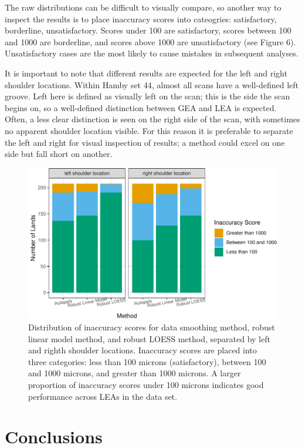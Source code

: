 \documentclass[]{article}
\begin{document}
The raw distributions can be difficult to visually compare, so another
way to inspect the results is to place inaccuracy scores into
cateogries: satisfactory, borderline, unsatisfactory. Scores under 100
are satisfactory, scores between 100 and 1000 are borderline, and scores
above 1000 are unsatisfactory (see Figure 6). Unsatisfactory cases are
the most likely to cause mistakes in subsequent analyses.

It is important to note that different results are expected for the left
and right shoulder locations. Within Hamby set 44, almost all scans have
a well-defined left groove. Left here is defined as visually left on the
scan; this is the side the scan begins on, so a well-defined distinction
between GEA and LEA is expected. Often, a less clear distinction is seen
on the right side of the scan, with sometimes no apparent shoulder
location visible. For this reason it is preferable to separate the left
and right for visual inspection of results; a method could excel on one
side but fall short on another.

\begin{figure}
\centering
\includegraphics{writeup_files/figure-latex/unnamed-chunk-6-1.pdf}
\caption{Distribution of inaccuracy scores for data smoothing method,
robust linear model method, and robust LOESS method, separated by left
and righth shoulder locations. Inaccuracy scores are placed into three
categories: less than 100 microns (satisfactory), between 100 and 1000
microns, and greater than 1000 microns. A larger proportion of
inaccuracy scores under 100 microns indicates good performance across
LEAs in the data set.}
\end{figure}

\section{Conclusions}
\end{document}
